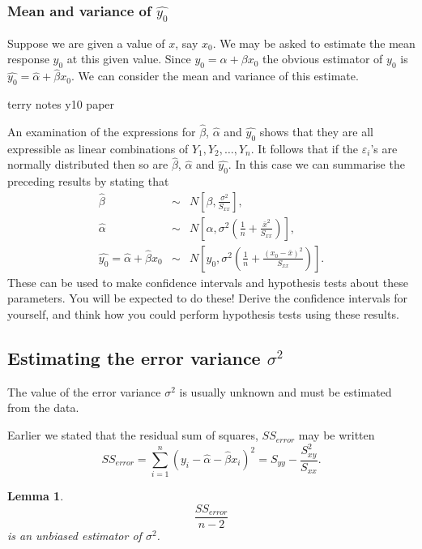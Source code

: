 \documentclass[12pt]{article}
\newtheorem{lemma}[theorem]{Lemma}
\begin{document}
\subsubsection{Mean and variance of $\hat{y_{0}}$}
Suppose we are given a value of $x$, say $x_{0}$. We may be asked to estimate the mean response $y_{0}$ at this given value. Since $y_{0}=\alpha+\beta x_{0}$ the obvious estimator of $y_{0}$ is $\hat{y_{0}}=\hat{\alpha}+\hat{\beta} x_{0}.$ We can consider the mean and variance of this estimate.
\begin{mdframed}
\textcolor[rgb]{1.00,1.00,1.00}{terry notes y10 paper\lipsum[1-4]}
\end{mdframed}

An examination of the expressions for $\hat{\beta}$, $\hat{\alpha}$ and $\hat{y_{0}}$ shows that they are all expressible as linear combinations of $Y_{1},Y_{2},\ldots,Y_{n}$. It follows that if the $\varepsilon_{i}$'s are normally distributed then so are $\hat{\beta}$, $\hat{\alpha}$ and $\hat{y_{0}}$. In this case we can summarise the preceding results by stating that
\begin{eqnarray*}
  \hat{\beta} &\sim& N\left[\beta,\frac{\sigma^{2}}{S_{xx}}\right], \\
  \hat{\alpha} &\sim& N\left[\alpha,\sigma^{2}\left(\frac{1}{n}+\frac{\bar{x}^{2}}{S_{xx}}\right)\right], \\
  \hat{y_{0}}=\hat{\alpha}+\hat{\beta}x_{0} &\sim& N\left[y_{0},\sigma^{2}\left(\frac{1}{n}+\frac{(x_{0}-\bar{x})^{2}}{S_{xx}}\right)\right].
\end{eqnarray*}
These can be used to make confidence intervals and hypothesis tests about these parameters. You will be expected to do these! Derive the confidence intervals for yourself, and think how you could perform hypothesis tests using these results.

\subsection{Estimating the error variance $\sigma^{2}$}
The value of the error variance $\sigma^{2}$ is usually unknown and must be estimated from the data.

Earlier we stated that the residual sum of squares, $SS_{error}$ may be written
$$SS_{error}=\sum_{i=1}^{n}(y_{i}-\hat{\alpha}-\hat{\beta} x_{i})^{2}=S_{yy}-\frac{S^{2}_{xy}}{S_{xx}}.$$

\begin{lemma}
  $$\frac{SS_{error}}{n-2}$$ is an unbiased estimator of $\sigma^{2}$.
\end{lemma}
\end{document}
